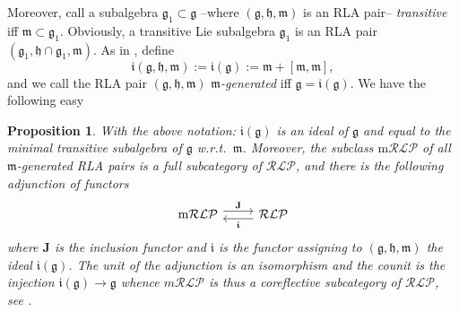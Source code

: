 \documentclass [11pt] {article}
\newtheorem {proposition} [lemma] {Proposition}
\theoremstyle{definition}
\begin{document}
 \noindent Moreover,
call a subalgebra $\mathfrak{g}_1\subset
\mathfrak{g}$ --where $(\mathfrak{g},\mathfrak{h},\mathfrak{m})$ is an RLA pair--
\textit{transitive} iff $\mathfrak{m}\subset \mathfrak{g}_1$. Obviously, a transitive Lie subalgebra $\mathfrak{g}_1$ is an RLA pair $(\mathfrak{g}_1,\mathfrak{h}\cap \mathfrak{g}_1,
\mathfrak{m})$. As in \cite[p.212, Thm.52]{KN69}, define
\begin{equation}\label{EqDefLieIdealI}
	\mathfrak{i}(\mathfrak{g},\mathfrak{h},\mathfrak{m}) :=
  \mathfrak{i}(\mathfrak{g}):= 
     \mathfrak{m} + [\mathfrak{m},\mathfrak{m}],
\end{equation}
and we call the RLA pair $(\mathfrak{g},\mathfrak{h},\mathfrak{m})$  \textit{$\mathfrak{m}$-generated} iff $\mathfrak{g}=\mathfrak{i}(\mathfrak{g})$.
We have the following easy
\begin{proposition} With the above notation: $\mathfrak{i}(\mathfrak{g})$ is an
	ideal of $\mathfrak{g}$ and equal to the minimal transitive subalgebra of 
	$\mathfrak{g}$ w.r.t.~$\mathfrak{m}$. Moreover,
  the subclass $\mathrm{m}\mathcal{RLP}$ of all \textit{$\mathfrak{m}$-generated}
  RLA pairs is a full subcategory of $\mathcal{RLP}$, and there is the following
  adjunction of functors
  \begin{equation}
  	\begin{tikzcd}
  		 \mathrm{m}\mathcal{RLP}
  		\arrow[r, yshift=0.7ex, "\mathbf{J}"]
  		&\mathcal{RLP}\arrow[l, yshift=-0.7ex, 
  		"\boldsymbol{\mathfrak{i}}"]
  	\end{tikzcd}
  \end{equation}
  where $\mathbf{J}$ is the inclusion functor and $\boldsymbol{\mathfrak{i}}$
  is the functor assigning to $(\mathfrak{g},\mathfrak{h},\mathfrak{m})$
  the ideal $\mathfrak{i}(\mathfrak{g})$. The unit of the adjunction is an isomorphism and the counit is the injection
  $\mathfrak{i}(\mathfrak{g})\to \mathfrak{g}$ whence $m\mathcal{RLP}$ is thus a coreflective subcategory of $\mathcal{RLP}$, see \cite[p.~91]{Mac98}.
\end{proposition}
\end{document}

